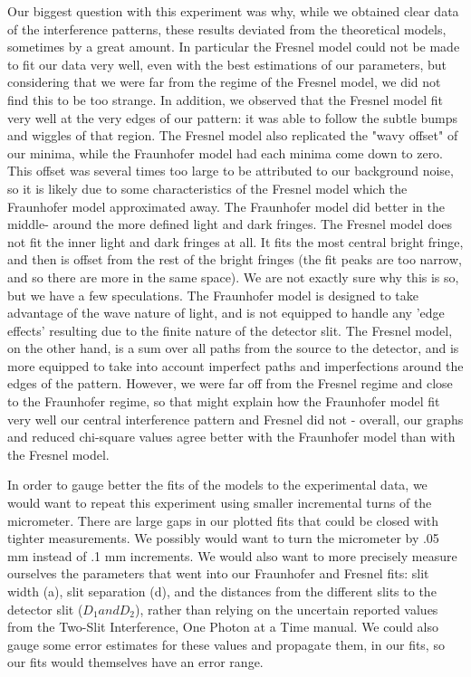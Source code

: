 \documentclass[prb,preprint]{revtex4-1}
\begin{document}
{Our biggest question with this experiment was why, while we obtained clear data of the interference patterns, these results deviated from the theoretical models, sometimes by a great amount.  In particular the Fresnel model could not be made to fit our data very well, even with the best estimations of our parameters, but considering that we were far from the regime of the Fresnel model, we did not find this to be too strange. In addition, we observed that the Fresnel model fit very well at the very edges of our pattern:  it was able to follow the subtle bumps and wiggles of that region.  The Fresnel model also replicated the "wavy offset" of our minima, while the Fraunhofer model had each minima come down to zero.  This offset was several times too large to be attributed to our background noise, so it is likely due to some characteristics of the Fresnel model which the Fraunhofer model approximated away.  The Fraunhofer model did better in the middle- around the more defined light and dark fringes.  The Fresnel model does not fit the inner light and dark fringes at all.  It fits the most central bright fringe, and then is offset from the rest of the bright fringes (the fit peaks are too narrow, and so there are more in the same space).  We are not exactly sure why this is so, but we have a few speculations.    The Fraunhofer model is designed to take advantage of the wave nature of light, and is not equipped to handle any 'edge effects' resulting due to the finite nature of the detector slit.  The Fresnel model, on the other hand, is a sum over all paths from the source to the detector, and is more equipped to take into account imperfect paths and imperfections around the edges of the pattern.   However, we were far off from the Fresnel regime and close to the Fraunhofer regime, so that might explain how the Fraunhofer model fit very well our central interference pattern and Fresnel did not - overall, our graphs and reduced chi-square values agree better with the Fraunhofer model than with the Fresnel model.  \cite{teachspin}

In order to gauge better the fits of the models to the experimental data, we would want to repeat this experiment using smaller incremental turns of the micrometer.  There are large gaps in our plotted fits that could be closed with tighter measurements.  We possibly would want to turn the micrometer by .05 mm instead of .1 mm increments.  We would also want to more precisely measure ourselves the parameters that went into our Fraunhofer and Fresnel fits:  slit width (a), slit separation (d), and the distances from the different slits to the detector slit ($D_{1} and D_{2}$), rather than relying on the uncertain reported values from the Two-Slit Interference, One Photon at a Time manual.  We could also gauge some error estimates for these values and propagate them, in our fits, so our fits would themselves have an error range.

}
\end{document}
